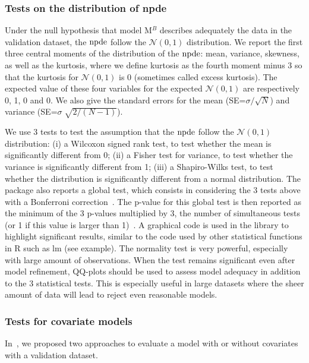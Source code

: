 \subsubsection{Tests on the distribution of npde} 
\hskip 18pt Under the null hypothesis that model M$^B$ describes adequately the data in the validation dataset, the ${\rm npde}$ follow the $\mathcal{N}(0, 1)$ distribution. We report the first three central moments of the distribution of the ${\rm npde}$: mean, variance, skewness, as well as the kurtosis, where we define kurtosis as the fourth moment minus 3 so that the kurtosis for $\mathcal{N}(0,1)$ is 0 (sometimes called excess kurtosis). The expected value of these four variables for the expected $\mathcal{N}(0,1)$ are respectively 0, 1, 0 and 0. We also give the standard errors for the mean (SE=$\sigma/\sqrt{N}$) and variance (SE=$\sigma \; \sqrt{2/(N-1)}$).

We use 3 tests to test the assumption that the ${\rm npde}$ follow the $\mathcal{N}(0, 1)$ distribution: (i) a Wilcoxon signed rank test, to test whether the mean is significantly different from 0; (ii) a Fisher test for variance, to test whether the variance is significantly different from 1; (iii) a Shapiro-Wilks test, to test whether the distribution is significantly different from a normal distribution. The package also reports a global test, which consists in considering the 3 tests above with a Bonferroni correction~\cite{Brendel10}. The p-value for this global test is then reported as the minimum of the 3 p-values multiplied by 3, the number of simultaneous tests (or 1 if this value is larger than 1)~\cite{Wright}. A graphical code is used in the library to highlight significant results, similar to the code used by other statistical functions in {\sf R} such as {\sf lm} (see example). The normality test is very powerful, especially with large amount of observations. When the test remains significant even 
after model refinement, QQ-plots should be used to assess model adequacy in addition to the 3 statistical tests. This is especially useful in large datasets where the sheer amount of data will lead to reject even reasonable models.

\subsubsection{Tests for covariate models} 

\hskip 18pt In~\cite{Brendel10}, we proposed two approaches to evaluate a model with or without covariates with a validation dataset. 

